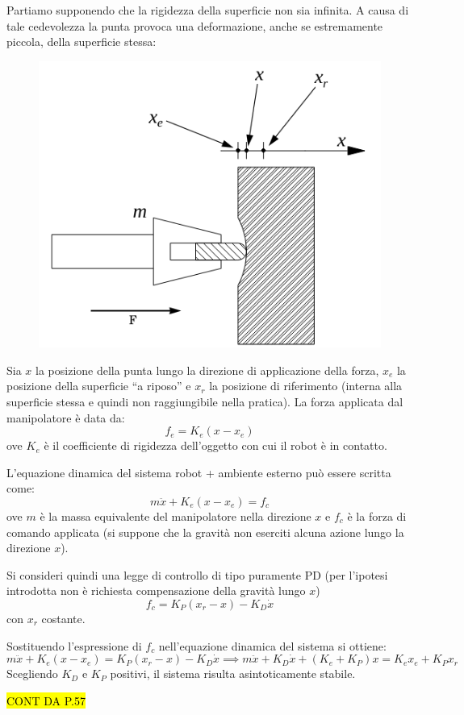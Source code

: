 Partiamo supponendo che la rigidezza della superficie non sia infinita. A causa di tale cedevolezza la punta provoca una deformazione, anche se estremamente piccola, della superficie stessa:

\begin{figure}[H]
	\centering
	\includegraphics[width=0.4\linewidth]{images/compliance_control_1}
	\label{fig:compliancecontrol1}
\end{figure}

Sia $x$ la posizione della punta lungo la direzione di applicazione della forza, $x_e$ la posizione della superficie “a riposo” e $x_r$ la posizione di riferimento (interna alla superficie stessa e quindi non raggiungibile nella pratica).
La forza applicata dal manipolatore è data da:
$$
f_e = K_e(x - x_e)
$$
ove $K_e$ è il coefficiente di rigidezza dell’oggetto con cui il robot è in contatto.

L’equazione dinamica del sistema robot + ambiente esterno può essere scritta come:
$$
m\ddot{x} + K_e(x - x_e) = f_c
$$
ove $m$ è la massa equivalente del manipolatore nella direzione $x$ e $f_c$ è la forza di comando applicata (si suppone che la gravità non eserciti alcuna azione lungo la direzione $x$).

Si consideri quindi una legge di controllo di tipo puramente PD (per l’ipotesi introdotta non è richiesta compensazione della gravità lungo $x$)
$$
f_c = K_P(x_r - x) - K_D\dot{x}
$$
con $x_r$ costante.

Sostituendo l’espressione di $f_c$ nell’equazione dinamica del sistema si ottiene:
$$
m\ddot{x} + K_e(x - x_e) = K_P(x_r - x) - K_D\dot{x}
\implies
m\ddot{x} + K_D\dot{x} + (K_e + K_P)x = K_ex_e + K_Px_r
$$
Scegliendo $K_D$ e $K_P$ positivi, il sistema risulta asintoticamente stabile.

\hl{CONT DA P.57}